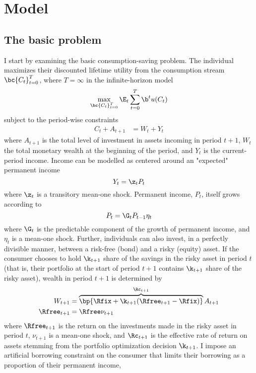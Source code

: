 \section{Model}

\subsection{The basic problem}

I start by examining the basic consumption-saving problem. The individual maximizes their discounted lifetime utility from the consumption stream $\bc{C_{t}}_{t=0}^{T}$, where $T = \infty$ in the infinite-horizon model
\begin{equation}\label{eq:prb}
   \max_{\bc{C_t}_{t=0}^{T}}\E_{t}\sum_{t=0}^{T}\b^t u(C_t)
\end{equation}
subject to the period-wise constraints
\begin{align*}
    C_{t} + A_{t+1} &= W_{t} + Y_{t}
\end{align*}
where $A_{t+1}$ is the total level of investment in assets incoming in period $t+1$, $W_{t}$ the total monetary wealth at the beginning of the period, and $Y_{t}$ is the current-period income. Income can be modelled as centered around an "expected" permanent income
\begin{equation}\label{eq:inc}
    Y_t = \z_t P_t
\end{equation}
where $\z_t$ is a transitory mean-one shock. Permanent income, $P_t$, itself grows according to
\begin{equation}\label{eq:perm_inc}
    P_t = \G_t P_{t-1} \eta_t
\end{equation}
where $\G_t$ is the predictable component of the growth of permanent income, and $\eta_t$ is a mean-one shock. Further, individuals can also invest, in a perfectly divisible manner, between a risk-free (bond) and a risky (equity) asset. If the consumer chooses to hold $\k_{t+1}$ share of the savings in the risky asset in period $t$ (that is, their portfolio at the start of period $t+1$ contains $\k_{t+1}$ share of the risky asset), wealth in period $t+1$ is determined by
\begin{align}
    W_{t+1} &= \overbrace{\bp{\Rfix + \k_{t+1}(\Rfree_{t+1} - \Rfix)}}^{\Rc_{t+1}}A_{t+1} \label{eq:wealth}\\
    \Rfree_{t+1} &= \Rfree \nu_{t+1} \label{eq:return}
\end{align}
where $\Rfree_{t+1}$ is the return on the investments made in the risky asset in period $t$, $\nu_{t+1}$ is a mean-one shock, and $\Rc_{t+1}$ is the effective rate of return on assets stemming from the portfolio optimization decision $\k_{t+1}$. I impose an artificial borrowing constraint on the consumer that limits their borrowing as a proportion of their permanent income,
